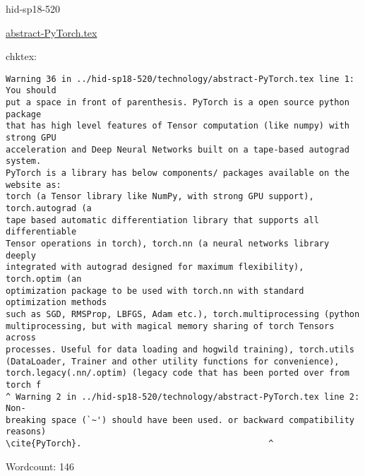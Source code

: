 \begin{IU}

hid-sp18-520

\href{https://github.com/cloudmesh-community/hid-sp18-520/blob/master//technology/abstract-PyTorch.tex}{abstract-PyTorch.tex}

 
chktex:
\begin{tiny}
\begin{verbatim}
Warning 36 in ../hid-sp18-520/technology/abstract-PyTorch.tex line 1: You should
put a space in front of parenthesis. PyTorch is a open source python package
that has high level features of Tensor computation (like numpy) with strong GPU
acceleration and Deep Neural Networks built on a tape-based autograd system.
PyTorch is a library has below components/ packages available on the website as:
torch (a Tensor library like NumPy, with strong GPU support), torch.autograd (a
tape based automatic differentiation library that supports all differentiable
Tensor operations in torch), torch.nn (a neural networks library deeply
integrated with autograd designed for maximum flexibility), torch.optim (an
optimization package to be used with torch.nn with standard optimization methods
such as SGD, RMSProp, LBFGS, Adam etc.), torch.multiprocessing (python
multiprocessing, but with magical memory sharing of torch Tensors across
processes. Useful for data loading and hogwild training), torch.utils
(DataLoader, Trainer and other utility functions for convenience),
torch.legacy(.nn/.optim) (legacy code that has been ported over from torch f
^ Warning 2 in ../hid-sp18-520/technology/abstract-PyTorch.tex line 2: Non-
breaking space (`~') should have been used. or backward compatibility reasons)
\cite{PyTorch}.                                     ^
\end{verbatim}
\end{tiny}

Wordcount: 146

\end{IU}



